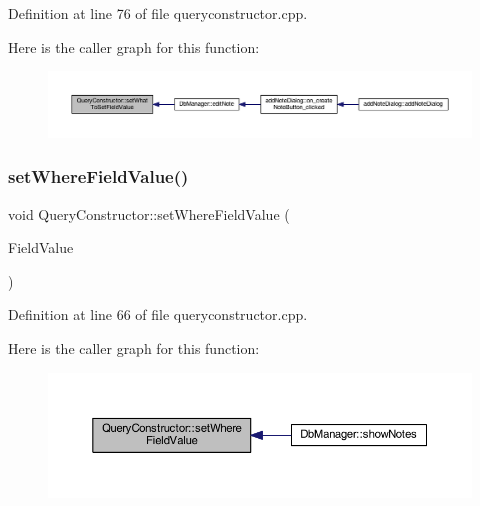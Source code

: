 Definition at line 76 of file queryconstructor.\+cpp.

Here is the caller graph for this function\+:
\nopagebreak
\begin{figure}[H]
\begin{center}
\leavevmode
\includegraphics[width=350pt]{classQueryConstructor_a969ca6d0c1d258f8a6e6f587f545c2d2_icgraph}
\end{center}
\end{figure}
\hypertarget{classQueryConstructor_a304819b8f851385fa6925cc273ccc94d}{}\label{classQueryConstructor_a304819b8f851385fa6925cc273ccc94d} 
\subsubsection{\texorpdfstring{set\+Where\+Field\+Value()}{setWhereFieldValue()}}
{\footnotesize\ttfamily void Query\+Constructor\+::set\+Where\+Field\+Value (\begin{DoxyParamCaption}\item[{const Q\+Map$<$ Q\+String, Q\+String $>$ \&}]{Field\+Value }\end{DoxyParamCaption})}



Definition at line 66 of file queryconstructor.\+cpp.

Here is the caller graph for this function\+:
\nopagebreak
\begin{figure}[H]
\begin{center}
\leavevmode
\includegraphics[width=350pt]{classQueryConstructor_a304819b8f851385fa6925cc273ccc94d_icgraph}
\end{center}
\end{figure}



